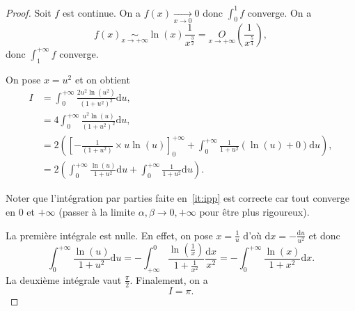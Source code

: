 \documentclass[12pt]{article}
\begin{document}
\begin{proof}
    Soit \function{f}{]0,+\infty}{\R}{x}{\frac{\sqrt{x}\ln(x)}{(1+x)^{2}}}
    $f$ est continue. On a $f(x)\xrightarrow[x\to0]{}0$ donc $\int_{0}^{1}f$ converge. On a 
    \begin{equation*}
        f(x)\underset{x\to+\infty}{\sim}\ln(x)\frac{1}{x^{\frac{3}{2}}}=\underset{x\to+\infty}{O}\left(\frac{1}{x^{\frac{5}{4}}}\right),    
    \end{equation*}
    donc $\int_{1}^{+\infty}f$ converge.

    On pose $x=u^{2}$ et on obtient 
    \begin{align}
        I
        &=\int_{0}^{+\infty}\frac{2u^{2}\ln(u^{2})}{(1+u^{2})^{2}}\mathrm{d}u,\nonumber\\
        &=4\int_{0}^{+\infty}\frac{u^{2}\ln(u)}{(1+u^{2})^{2}}\mathrm{d}u,\nonumber\\
        &=2\left(\left[-\frac{1}{(1+u^{2})}\times u\ln(u)\right]_{0}^{+\infty}+\int_{0}^{+\infty}\frac{1}{1+u^{2}}\left(\ln(u)+0\right)\mathrm{d}u\right),\label{it:ipp}\\
        &=2\left(\int_{0}^{+\infty}\frac{\ln(u)}{1+u^{2}}\mathrm{d}u+\int_{0}^{+\infty}\frac{1}{1+u^{2}}\mathrm{d}u\right).\nonumber
    \end{align}

    Noter que l'intégration par parties faite en~\ref{it:ipp} est correcte car tout converge en 0 et $+\infty$ (passer à la limite $\alpha,\beta\to0,+\infty$ pour être plus rigoureux).

    La première intégrale est nulle. En effet, on pose $x=\frac{1}{u}$ d'où $\mathrm{d}x=-\frac{\mathrm{d}u}{u^{2}}$ et donc 
    \begin{equation*}
        \int_{0}^{+\infty}\frac{\ln(u)}{1+u^{2}}\mathrm{d}u=-\int_{+\infty}^{0}\frac{\ln\left(\frac{1}{x}\right)}{1+\frac{1}{x^{2}}}\frac{\mathrm{d}x}{x^{2}}=-\int_{0}^{+\infty}\frac{\ln(x)}{1+x^{2}}\mathrm{d}x.
    \end{equation*}
    La deuxième intégrale vaut $\frac{\pi}{2}$. Finalement, on a 
    \begin{equation*}
        \boxed{
            I=\pi.
        }
    \end{equation*}
\end{proof}
\end{document}
